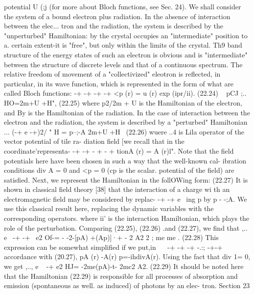 \documentclass[a4paper,sfsidenotes,colorlinks=true]{tufte-book}
\numberwithin{equation}{section}
\numberwithin{figure}{section}
\begin{document}
{{{{potential U (;j (for more about Bloch functions, see Sec. 24).
We shall consider the system of a bound electron plus radiation. In the absence of interaction between the elec... tron and the radiation, the system is described by the "unperturbed" Hamiltonian:
by the crystal occupies an "intermediate" position to a. certain extent-it is "free", but only within the limits of the crystal. Th9 band structure of the energy states of such an electron is obvious and is "intermediate" between the structure of discrete levels and that of a continuous spectrum.
The relative freedom of movement of a "collectivized" eleotron is reflected, in particular, in its wave function, which is represented in the form of what are called Bloch functions:
-+	-+	-+ -+
<p (r) = u (r) exp (ipr/ii).	(22.24)
~	pCJ	;.. HO=2m+U +H",
(22.25)
where p2/2m + U is the Hamiltonian of the electron, and
By is the Hamiltonian of the radiation. In the case of interaction between the electron and the radiation, the system is described by a "perturbed" Hamiltonian
...	(-+ e -+)2/	" H =	p--;-A	2m+U +H~	(22.26)
wuere ..4 is Lila operator of the vector potential of tile ra- diation field [we recall that in the coordinate'representa-
-+ -+	- + - + tionA (r) = A (r)l". Note that the field potentials here
have been chosen in such a way that the well-known cal-
ibration conditions div A = 0 and <p = 0 (cp is the scalar. potential of the field) are satisfied. Next, we represent the Hamiltonian in the follOWing form:
(22.27)
 It is shown in classical field theory [38] that the interaction of a charge wi th an electromagnetic field may be considered by replac-
-+ -+ e~ ing p by p - -;A. We use this classical result here, replacing
the dynamic variables with the corresponding operators.
where ii' is the interaction Hamiltonian, which plays the role of the perturbation. Comparing (22.25), (22.26)
.and (22.27), we find that
,..	e ~-+	-+~	e2 Of-= - -2-[pA) +(Ap)]·+ - 2 A2
2 ; me me
.
(22.28)
This expression can be somewhat simplified if we put,in ~~ -+	-+ -+ -.:;	-+-+
accordance with (20.27), pA (r) -A(r) p=-ihdivA(r). Using the fact that div 1= 0, we get
,..,	e	~ -+	e2 HJ= -2me(pA)-t- 2mc2	A2.	(22.29)
It should be noted here that the Hamiltonian (22.29) is responsible for all processes of absorption and emission (spontaneous as well. as induced) of photons by an elec- tron.
Section 23
}}}}
\end{document}
